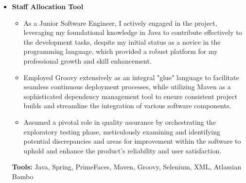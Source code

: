 \documentclass[11pt,a4paper,english]{moderncv}
\begin{document}
{\begin{itemize}
\begin{itemize}
            \item My responsibilities also included conducting comprehensive training sessions focused on unit, integration, and end-to-end testing methodologies using advanced Python testing libraries, thereby significantly elevating the team's proficiency in delivering high-quality, bug-free code in alignment with industry best practices.
        \end{itemize}
        \textbf{Tools:} Python, Zope, Atlassian Bamboo
    \item \textbf{Staff Allocation Tool}
        \begin{itemize}
            \item As a Junior Software Engineer, I actively engaged in the project, leveraging my foundational knowledge in Java to contribute effectively to the development tasks, despite my initial status as a novice in the programming language, which provided a robust platform for my professional growth and skill enhancement.
            \item Employed Groovy extensively as an integral "glue" language to facilitate seamless continuous deployment processes, while utilizing Maven as a sophisticated dependency management tool to ensure consistent project builds and streamline the integration of various software components.
            \item Assumed a pivotal role in quality assurance by orchestrating the exploratory testing phase, meticulously examining and identifying potential discrepancies and areas for improvement within the software to uphold and enhance the product's reliability and user satisfaction.
        \end{itemize}
        \textbf{Tools:} Java, Spring, PrimeFaces, Maven, Groovy, Selenium, XML, Atlassian Bambo
\end{itemize}
}

\subsection{}
\end{document}
